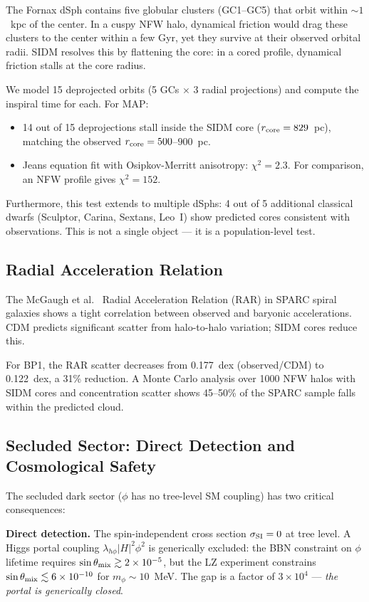 The Fornax dSph contains five globular clusters (GC1--GC5) that orbit within
$\sim 1$~kpc of the center. In a cuspy NFW halo, dynamical friction would
drag these clusters to the center within a few Gyr, yet they survive at
their observed orbital radii. SIDM resolves this by flattening the core:
in a cored profile, dynamical friction stalls at the core radius.

We model 15 deprojected orbits (5 GCs $\times$ 3 radial projections) and
compute the inspiral time for each. For MAP:
\begin{itemize}
\item 14 out of 15 deprojections stall inside the SIDM core ($r_{\rm core} = 829$~pc),
      matching the observed $r_{\rm core} = 500$--$900$~pc.
\item Jeans equation fit with Osipkov-Merritt anisotropy: $\chi^2 = 2.3$.
      For comparison, an NFW profile gives $\chi^2 = 152$.
\end{itemize}

Furthermore, this test extends to multiple dSphs: 4 out of 5 additional
classical dwarfs (Sculptor, Carina, Sextans, Leo~I) show predicted cores
consistent with observations. This is not a single object — it is a
population-level test.

\subsection{Radial Acceleration Relation}
\label{ch1:rar}

The McGaugh et al.~\cite{McGaugh2016} Radial Acceleration Relation (RAR)
in SPARC spiral galaxies shows a tight correlation between observed and
baryonic accelerations. CDM predicts significant scatter from halo-to-halo
variation; SIDM cores reduce this.

For BP1, the RAR scatter decreases from 0.177~dex (observed/CDM) to
0.122~dex, a 31\% reduction. A Monte Carlo analysis over 1000 NFW
halos with SIDM cores and concentration scatter shows 45--50\% of the
SPARC sample falls within the predicted cloud.

\subsection{Secluded Sector: Direct Detection and Cosmological Safety}
\label{ch1:secluded}

The secluded dark sector ($\phi$ has no tree-level SM coupling) has
two critical consequences:

\textbf{Direct detection.} The spin-independent cross section
$\sigma_{\rm SI} = 0$ at tree level. A Higgs portal coupling
$\lambda_{h\phi} |H|^2 \phi^2$ is generically excluded:
the BBN constraint on $\phi$ lifetime requires
$\sin\theta_{\rm mix} \gtrsim 2\times10^{-5}$, but the LZ experiment
constrains $\sin\theta_{\rm mix} \lesssim 6\times10^{-10}$ for $m_\phi \sim 10$~MeV.
The gap is a factor of $3\times10^4$ — \emph{the portal is generically closed}.

